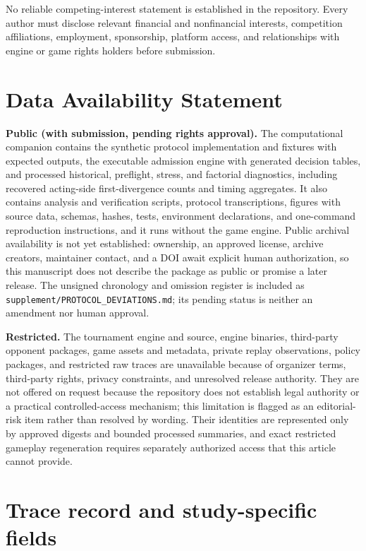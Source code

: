 \documentclass[aps,reprint,superscriptaddress,longbibliography,floatfix]{revtex4-2}
\begin{document}
No reliable competing-interest statement is established in the repository.
Every author must disclose relevant financial and nonfinancial interests,
competition affiliations, employment, sponsorship, platform access, and
relationships with engine or game rights holders before submission.

\section*{Data Availability Statement}

\textbf{Public (with submission, pending rights approval).} The computational
companion contains the synthetic protocol implementation and fixtures with
expected outputs, the executable admission engine with generated decision
tables, and processed historical, preflight, stress, and factorial
diagnostics, including recovered acting-side first-divergence counts and
timing aggregates.  It also contains analysis and verification scripts,
protocol transcriptions, figures with source data, schemas, hashes, tests,
environment declarations, and one-command reproduction instructions, and it
runs without the game engine.  Public archival availability is not yet
established: ownership, an approved license, archive creators, maintainer
contact, and a DOI await explicit human authorization, so this manuscript does
not describe the package as public or promise a later release.  The unsigned
chronology and omission register is included as
\texttt{supplement/PROTOCOL\_DEVIATIONS.md}; its pending status is neither an
amendment nor human approval.

\textbf{Restricted.} The tournament engine and source, engine binaries,
third-party opponent packages, game assets and metadata, private replay
observations, policy packages, and restricted raw traces are unavailable
because of organizer terms, third-party rights, privacy constraints, and
unresolved release authority. They are not offered on request because the
repository does not establish legal authority or a practical controlled-access
mechanism; this limitation is flagged as an editorial-risk item rather than
resolved by wording. Their identities are represented only by approved digests
and bounded processed summaries, and exact restricted gameplay regeneration
requires separately authorized access that this article cannot provide.

\appendix

\section{Trace record and study-specific fields}
\end{document}
